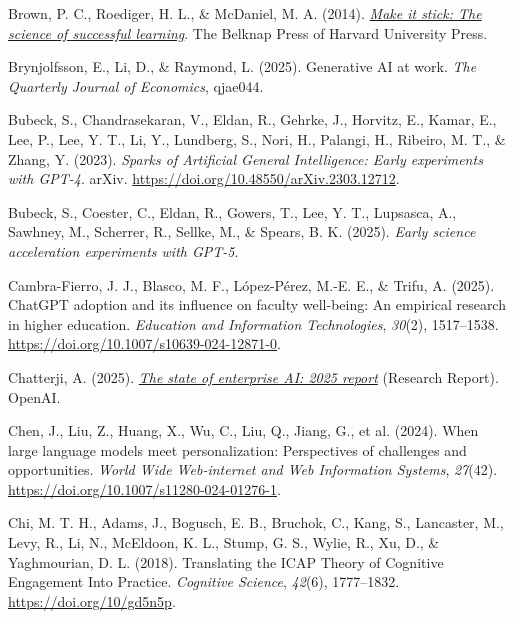 \documentclass[
  ngerman,
  letterpaper,
  DIV=11]{scrreprt}
\newlength{\cslhangindent}
\newenvironment{CSLReferences}[2] %
 {\begin{list}{}{%
  \setlength{\itemindent}{0pt}
  \setlength{\leftmargin}{0pt}
  \setlength{\parsep}{0pt}
  \ifodd #1
   \setlength{\leftmargin}{\cslhangindent}
   \setlength{\itemindent}{-1\cslhangindent}
  \fi
  \setlength{\itemsep}{#2\baselineskip}}}
 {\end{list}}
\begin{document}
\begin{CSLReferences}{1}{0}
Brown, P. C., Roediger, H. L., \& McDaniel, M. A. (2014).
\emph{\href{http://search.ebscohost.com/login.aspx?direct=true&scope=site&db=nlebk&db=nlabk&AN=771951}{Make
it stick: The science of successful learning}}. The Belknap Press of
Harvard University Press.

Brynjolfsson, E., Li, D., \& Raymond, L. (2025). Generative AI at work.
\emph{The Quarterly Journal of Economics}, qjae044.

Bubeck, S., Chandrasekaran, V., Eldan, R., Gehrke, J., Horvitz, E.,
Kamar, E., Lee, P., Lee, Y. T., Li, Y., Lundberg, S., Nori, H., Palangi,
H., Ribeiro, M. T., \& Zhang, Y. (2023). \emph{Sparks of Artificial
General Intelligence: Early experiments with GPT-4}. arXiv.
\url{https://doi.org/10.48550/arXiv.2303.12712}.

Bubeck, S., Coester, C., Eldan, R., Gowers, T., Lee, Y. T., Lupsasca,
A., Sawhney, M., Scherrer, R., Sellke, M., \& Spears, B. K. (2025).
\emph{Early science acceleration experiments with GPT-5}.

Cambra-Fierro, J. J., Blasco, M. F., López-Pérez, M.-E. E., \& Trifu, A.
(2025). ChatGPT adoption and its influence on faculty well-being: An
empirical research in higher education. \emph{Education and Information
Technologies}, \emph{30}(2), 1517--1538.
\url{https://doi.org/10.1007/s10639-024-12871-0}.

Chatterji, A. (2025).
\emph{\href{https://openai.com/index/the-state-of-enterprise-ai-2025-report/}{The
state of enterprise AI: 2025 report}} (Research Report). OpenAI.

Chen, J., Liu, Z., Huang, X., Wu, C., Liu, Q., Jiang, G., et al. (2024).
When large language models meet personalization: Perspectives of
challenges and opportunities. \emph{World Wide Web-internet and Web
Information Systems}, \emph{27}(42).
\url{https://doi.org/10.1007/s11280-024-01276-1}.

Chi, M. T. H., Adams, J., Bogusch, E. B., Bruchok, C., Kang, S.,
Lancaster, M., Levy, R., Li, N., McEldoon, K. L., Stump, G. S., Wylie,
R., Xu, D., \& Yaghmourian, D. L. (2018). Translating the ICAP Theory of
Cognitive Engagement Into Practice. \emph{Cognitive Science},
\emph{42}(6), 1777--1832. \url{https://doi.org/10/gd5n5p}.


\end{CSLReferences}
\end{document}
